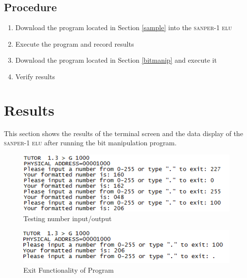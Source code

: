 \documentclass[12pt, twocolumn]{article}
\newcommand{\sanper}{\textsc{sanper-1 elu} }
\begin{document}
\subsection{Procedure}
\begin{enumerate}
	\item Download the program located in Section \ref{sample} into the \sanper
	\item Execute the program and record results
	\item Download the program located in Section \ref{bitmanip} and execute it
	\item Verify results
\end{enumerate}

\section{Results}

This section shows the results of the terminal screen and the data display of the \sanper after running the bit manipulation program.

\begin{figure}[H]
\centering
\includegraphics[width=\linewidth]{tests}
\caption{Testing number input/output}
\label{fig:tests}
\end{figure}

\begin{figure}[H]
\centering
\includegraphics[width=\linewidth]{Exit}
\caption{Exit Functionality of Program}
\label{fig:Exit}
\end{figure}
\end{document}
